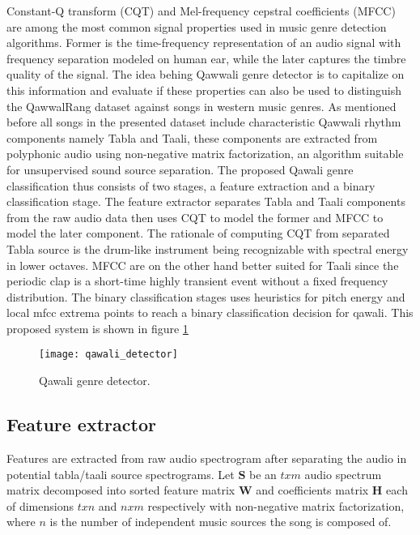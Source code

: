 \documentclass{article}
\begin{document}
Constant-Q transform (CQT) and Mel-frequency cepstral coefficients (MFCC) are  among the most common signal properties \citep{panagakis} used in music genre detection algorithms. Former is the time-frequency representation of an audio signal with frequency separation modeled on human ear, while the later captures the timbre quality of the signal. The idea behing Qawwali genre detector is to capitalize on this information and evaluate if these properties can also be used to distinguish the QawwalRang dataset against songs in western music genres.
As mentioned before all songs in the presented dataset include characteristic Qawwali rhythm components namely Tabla and Taali, these components are extracted from polyphonic audio using non-negative matrix factorization, an algorithm \citep{virtanen} suitable for unsupervised sound source separation.
The proposed Qawali genre classification thus consists of two stages, a feature extraction and a binary classification stage. The feature extractor separates Tabla and Taali components from the raw audio data then uses CQT to model the former and MFCC to model the later component. The rationale of computing CQT from separated Tabla source is the drum-like instrument being recognizable with spectral energy in lower octaves. MFCC are on the other hand better suited for Taali since the periodic clap is a short-time highly transient event without a fixed frequency distribution. The binary classification stages uses heuristics for pitch energy and local mfcc extrema points to reach a binary classification decision for qawali. This proposed system is shown in figure \ref{fig:block_dia}
\begin{figure}[htbp]
  \centering
  \texttt{[image: qawali\_detector]}
  \caption{Qawali genre detector.}
\label{fig:block_dia}
\end{figure}

\subsection{Feature extractor}

Features are extracted from raw audio spectrogram after separating the audio in potential tabla/taali source spectrograms. Let $\boldsymbol{S}$ be an $txm$ audio spectrum matrix decomposed into sorted feature matrix $\boldsymbol{W}$ and coefficients matrix $\boldsymbol{H}$ each of dimensions $txn$ and $nxm$ respectively with non-negative matrix factorization, where $n$ is the number of independent music sources the song is composed of.
\end{document}
